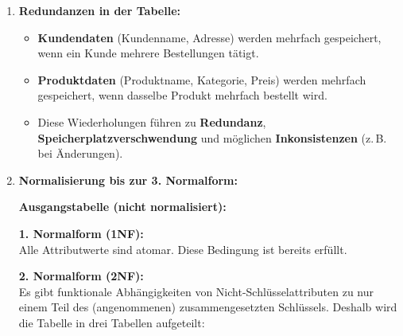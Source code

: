 \documentclass[a4paper,12pt]{article}
\begin{document}
	\begin{enumerate}
		\item \textbf{Redundanzen in der Tabelle:}
		\begin{itemize}
			\item \textbf{Kundendaten} (Kundenname, Adresse) werden mehrfach gespeichert, wenn ein Kunde mehrere Bestellungen tätigt.
			\item \textbf{Produktdaten} (Produktname, Kategorie, Preis) werden mehrfach gespeichert, wenn dasselbe Produkt mehrfach bestellt wird.
			\item Diese Wiederholungen führen zu \textbf{Redundanz}, \textbf{Speicherplatzverschwendung} und möglichen \textbf{Inkonsistenzen} (z.\,B. bei Änderungen).
		\end{itemize}
		
		\item \textbf{Normalisierung bis zur 3. Normalform:}
		
		\textbf{Ausgangstabelle (nicht normalisiert):}
		
\begin{center}
\end{center}

		
		\vspace{1em}
		\textbf{1. Normalform (1NF):} \\
		Alle Attributwerte sind atomar. Diese Bedingung ist bereits erfüllt.
		
		\vspace{1em}
		\textbf{2. Normalform (2NF):} \\
		Es gibt funktionale Abhängigkeiten von Nicht-Schlüsselattributen zu nur einem Teil des (angenommenen) zusammengesetzten Schlüssels. Deshalb wird die Tabelle in drei Tabellen aufgeteilt:
		

\end{enumerate}
\end{document}
